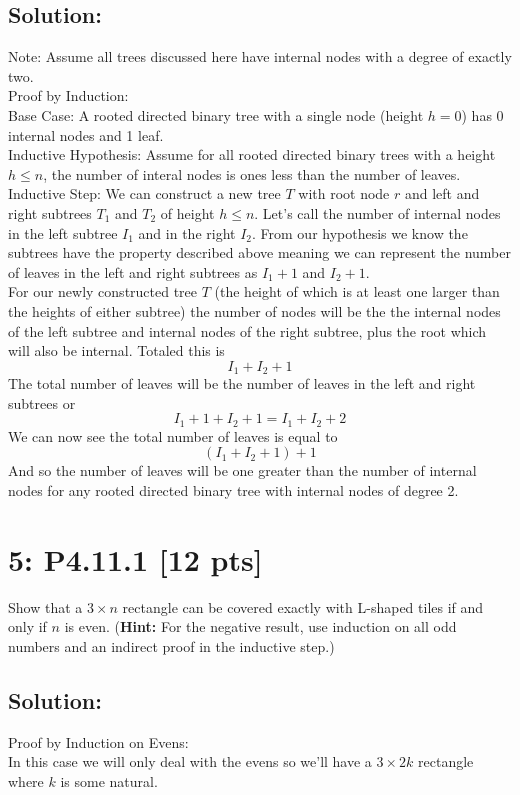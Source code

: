 \documentclass[12pt]{article}
\begin{document}
\subsection*{\textbf{Solution:}}
Note: Assume all trees discussed here have internal nodes with a degree of exactly two.\\
\noindent
Proof by Induction:\\

Base Case: A rooted directed binary tree with a single node (height $h=0$) has 0 internal nodes and 1 leaf.\\

Inductive Hypothesis: Assume for all rooted directed binary trees with a height $h \leq n$, the number of interal nodes is ones less than the number of leaves.\\

Inductive Step: We can construct a new tree $T$ with root node $r$ and left and right subtrees $T_1$ and $T_2$ of height $h \leq n$. Let's call the number of internal nodes in the left subtree $I_1$ and in the right $I_2$. From our hypothesis we know the subtrees have the property described above meaning we can represent the number of leaves in the left and right subtrees as $I_1 + 1$ and $I_2 + 1$.\\

For our newly constructed tree $T$ (the height of which is at least one larger than the heights of either subtree) the number of nodes will be the the internal nodes of the left subtree and internal nodes of the right subtree, plus the root which will also be internal. Totaled this is
\[ I_1 + I_2 + 1 \]
The total number of leaves will be the number of leaves in the left and right subtrees or
\[ I_1 + 1 + I_2 + 1 = I_1 + I_2 + 2\]
We can now see the total number of leaves is equal to
\[ (I_1 + I_2 + 1) + 1\]
And so the number of leaves will be one greater than the number of internal nodes for any rooted directed binary tree with internal nodes of degree 2.


\newpage
\section*{\textbf{5: P4.11.1} [12 pts]}
Show that a $3 \times n$ rectangle can be covered exactly with L-shaped tiles if and only if $n$ is even. (\textbf{Hint:} For the negative result, use induction on all odd numbers and an indirect proof in the inductive step.)


\subsection*{\textbf{Solution:}}
Proof by Induction on Evens:\\
In this case we will only deal with the evens so we'll have a $3 \times 2k$ rectangle where $k$ is some natural.\\
\end{document}
